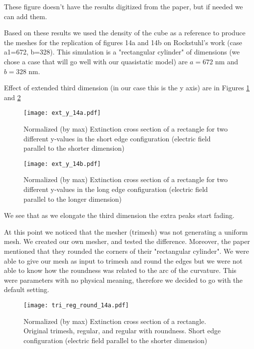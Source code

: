 These figure doesn't have the results digitized from the paper, but if needed we can add them. 

Based on these results we used the density of the cube as a reference to produce the meshes for the replication 
of figures 14a and 14b on Rockstuhl's work (case a1=672, b=328). This simulation is a "rectangular cylinder" of 
dimensions (we chose a case that will go well with our quasistatic model) are $a=672$ nm and $b=328$ nm. 

Effect of extended third dimension (in our case this is the y axis) are in Figures \ref{fig:ext_y_14a} and
\ref{fig:ext_y_14b}

\begin{figure}
    \centering
    \texttt{[image: ext\_y\_14a.pdf]} 
    \caption{Normalized (by max) Extinction cross section of a rectangle for two different y-values in the 
    short edge configuration (electric field parallel to the shorter dimension)}
    \label{fig:ext_y_14a}
 \end{figure}

 \begin{figure}
    \centering
    \texttt{[image: ext\_y\_14b.pdf]} 
    \caption{Normalized (by max) Extinction cross section of a rectangle for two different y-values in the 
    long edge configuration (electric field parallel to the longer dimension)}
    \label{fig:ext_y_14b}
 \end{figure}

We see that as we elongate the third dimension the extra peaks start fading. 

At this point we noticed that the mesher (trimesh) was not generating a uniform mesh. We created our 
own mesher, and tested the difference. Moreover, the paper mentioned that they rounded the corners of their
"rectangular cylinder". We were able to give our mesh as input to trimesh and round the edges but we were not able 
to know how the roundness was related to the arc of the curvature. This were parameters with no physical meaning, 
therefore we decided to go with the default setting. 


\begin{figure}
    \centering
    \texttt{[image: tri\_reg\_round\_14a.pdf]} 
    \caption{Normalized (by max) Extinction cross section of a rectangle. Original trimesh, regular, and regular with 
    roundness. Short edge configuration (electric field parallel to the shorter dimension)}
    \label{fig:tri_reg_round_14a}
 \end{figure}

